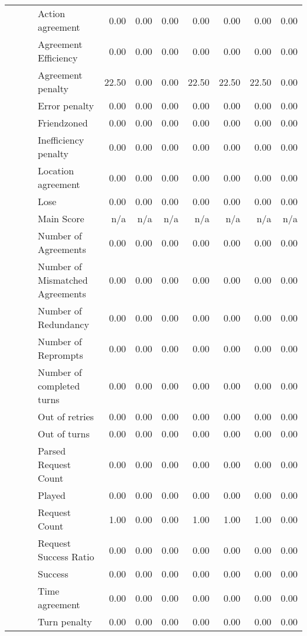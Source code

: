 \begin{tabular}{llllrrrrrrr}
 &  &  & Action agreement & 0.00 & 0.00 & 0.00 & 0.00 & 0.00 & 0.00 & 0.00 \\
 &  &  & Agreement Efficiency & 0.00 & 0.00 & 0.00 & 0.00 & 0.00 & 0.00 & 0.00 \\
 &  &  & Agreement penalty & 22.50 & 0.00 & 0.00 & 22.50 & 22.50 & 22.50 & 0.00 \\
 &  &  & Error penalty & 0.00 & 0.00 & 0.00 & 0.00 & 0.00 & 0.00 & 0.00 \\
 &  &  & Friendzoned & 0.00 & 0.00 & 0.00 & 0.00 & 0.00 & 0.00 & 0.00 \\
 &  &  & Inefficiency penalty & 0.00 & 0.00 & 0.00 & 0.00 & 0.00 & 0.00 & 0.00 \\
 &  &  & Location agreement & 0.00 & 0.00 & 0.00 & 0.00 & 0.00 & 0.00 & 0.00 \\
 &  &  & Lose & 0.00 & 0.00 & 0.00 & 0.00 & 0.00 & 0.00 & 0.00 \\
 &  &  & Main Score & n/a & n/a & n/a & n/a & n/a & n/a & n/a \\
 &  &  & Number of Agreements & 0.00 & 0.00 & 0.00 & 0.00 & 0.00 & 0.00 & 0.00 \\
 &  &  & Number of Mismatched Agreements & 0.00 & 0.00 & 0.00 & 0.00 & 0.00 & 0.00 & 0.00 \\
 &  &  & Number of Redundancy & 0.00 & 0.00 & 0.00 & 0.00 & 0.00 & 0.00 & 0.00 \\
 &  &  & Number of Reprompts & 0.00 & 0.00 & 0.00 & 0.00 & 0.00 & 0.00 & 0.00 \\
 &  &  & Number of completed turns & 0.00 & 0.00 & 0.00 & 0.00 & 0.00 & 0.00 & 0.00 \\
 &  &  & Out of retries & 0.00 & 0.00 & 0.00 & 0.00 & 0.00 & 0.00 & 0.00 \\
 &  &  & Out of turns & 0.00 & 0.00 & 0.00 & 0.00 & 0.00 & 0.00 & 0.00 \\
 &  &  & Parsed Request Count & 0.00 & 0.00 & 0.00 & 0.00 & 0.00 & 0.00 & 0.00 \\
 &  &  & Played & 0.00 & 0.00 & 0.00 & 0.00 & 0.00 & 0.00 & 0.00 \\
 &  &  & Request Count & 1.00 & 0.00 & 0.00 & 1.00 & 1.00 & 1.00 & 0.00 \\
 &  &  & Request Success Ratio & 0.00 & 0.00 & 0.00 & 0.00 & 0.00 & 0.00 & 0.00 \\
 &  &  & Success & 0.00 & 0.00 & 0.00 & 0.00 & 0.00 & 0.00 & 0.00 \\
 &  &  & Time agreement & 0.00 & 0.00 & 0.00 & 0.00 & 0.00 & 0.00 & 0.00 \\
 &  &  & Turn penalty & 0.00 & 0.00 & 0.00 & 0.00 & 0.00 & 0.00 & 0.00 \\

\end{tabular}
